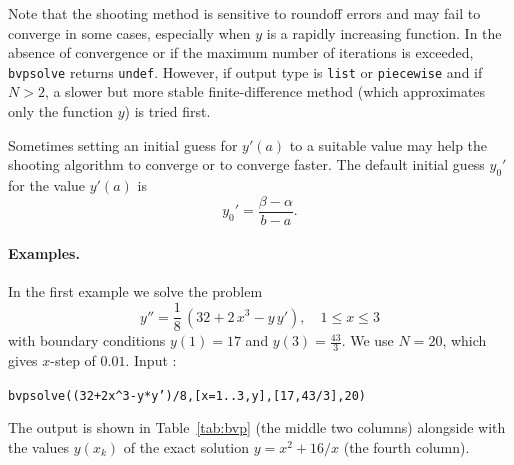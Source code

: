 \documentclass[a4paper,11pt]{book}
\begin{document}
Note that the shooting method is sensitive to roundoff errors and may fail to converge in some cases, especially when $y$ is a rapidly increasing function. In the absence of convergence or if the maximum number of iterations is exceeded, {\tt bvpsolve} returns {\tt undef}. However, if output type is {\tt list} or {\tt piecewise} and if $N>2$, a slower but more stable finite-difference method (which approximates only the function $y$) is tried first.

Sometimes setting an initial guess for $y'(a)$ to a suitable value may help the shooting algorithm to converge or to converge faster. The default initial guess $y_0'$ for the value $y'(a)$ is\[ y_0'=\frac{\beta-\alpha}{b-a}. \]

\paragraph{Examples.}
In the first example we solve the problem \[y''=\frac{1}{8}\,(32+2\,x^3-y\,y'),\quad 1\leq x\leq 3\] with boundary conditions $y(1)=17$ and $y(3)=\frac{43}{3}$. We use $N=20$, which gives $x$-step of $0.01$. Input :
\begin{center}
  \tt bvpsolve((32+2x\verb|^|3-y*y')/8,[x=1..3,y],[17,43/3],20)
\end{center}
The output is shown in Table~\ref{tab:bvp} (the middle two columns) alongside with the values $y(x_k)$ of the exact solution $y=x^2+16/x$ (the fourth column).
\end{document}
